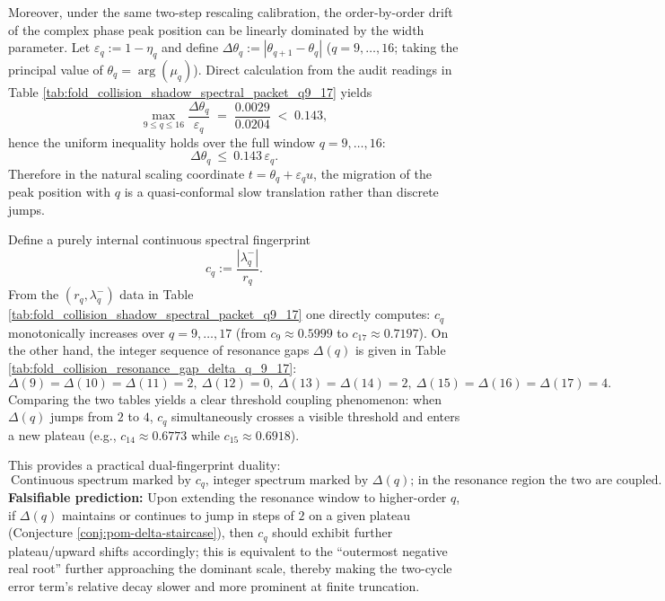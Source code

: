 \begin{remark}[Poisson peak at the two-step rescaling point \texorpdfstring{$\Rightarrow$}{=>} Lorentz limit: Breit--Wigner discrete prelimit of the resonance-window shadow spectral packet]
Moreover, under the same two-step rescaling calibration, the order-by-order drift of the complex phase peak position can be linearly dominated by the width parameter.
Let
\(
\varepsilon_q:=1-\eta_q
\)
and define
\(
\Delta\theta_q:=|\theta_{q+1}-\theta_q|
\)
(\(q=9,\dots,16\); taking the principal value of \(\theta_q=\arg(\mu_q)\)).
Direct calculation from the audit readings in Table \ref{tab:fold_collision_shadow_spectral_packet_q9_17} yields
\[
\max_{9\le q\le 16}\frac{\Delta\theta_q}{\varepsilon_q}
\;=\;\frac{0.0029}{0.0204}\;<\;0.143,
\]
hence the uniform inequality holds over the full window \(q=9,\dots,16\):
\[
\Delta\theta_q\ \le\ 0.143\,\varepsilon_q.
\]
Therefore in the natural scaling coordinate \(t=\theta_q+\varepsilon_q u\), the migration of the peak position with \(q\) is a quasi-conformal slow translation rather than discrete jumps.
\end{remark}



\begin{remark}\label{rem:pom-delta-cq-threshold}
Define a purely internal continuous spectral fingerprint
\[
c_q:=\frac{|\lambda_q^-|}{r_q}.
\]
From the \((r_q,\lambda_q^-)\) data in Table \ref{tab:fold_collision_shadow_spectral_packet_q9_17} one directly computes: \(c_q\) monotonically increases over \(q=9,\dots,17\) (from \(c_9\approx 0.5999\) to \(c_{17}\approx 0.7197\)).
On the other hand, the integer sequence of resonance gaps \(\Delta(q)\) is given in Table \ref{tab:fold_collision_resonance_gap_delta_q_9_17}:
\[
\Delta(9)=\Delta(10)=\Delta(11)=2,\ \Delta(12)=0,\ \Delta(13)=\Delta(14)=2,\ \Delta(15)=\Delta(16)=\Delta(17)=4.
\]
Comparing the two tables yields a clear threshold coupling phenomenon: when \(\Delta(q)\) jumps from \(2\) to \(4\), \(c_q\) simultaneously crosses a visible threshold and enters a new plateau (e.g., \(c_{14}\approx 0.6773\) while \(c_{15}\approx 0.6918\)).
\par
This provides a practical dual-fingerprint duality:
\[
\boxed{\ \text{Continuous spectrum marked by }c_q\text{, integer spectrum marked by }\Delta(q)\text{; in the resonance region the two are coupled.}\ }
\]
\textbf{Falsifiable prediction:} Upon extending the resonance window to higher-order \(q\), if \(\Delta(q)\) maintains or continues to jump in steps of \(2\) on a given plateau (Conjecture \ref{conj:pom-delta-staircase}), then \(c_q\) should exhibit further plateau/upward shifts accordingly; this is equivalent to the ``outermost negative real root'' further approaching the dominant scale, thereby making the two-cycle error term's relative decay slower and more prominent at finite truncation.
\end{remark}

